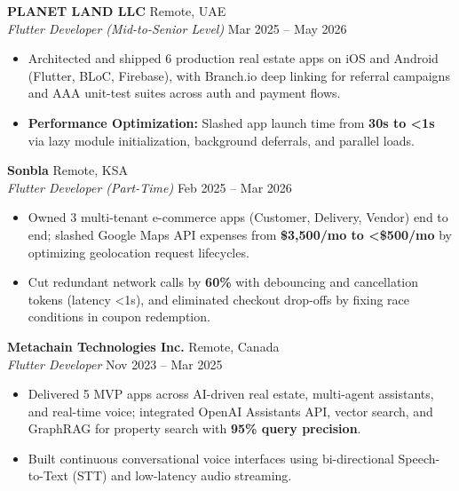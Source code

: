\documentclass[letterpaper,10pt]{article}
\begin{document}
\vspace{2pt}

\textbf{PLANET LAND LLC} \hfill Remote, UAE\\
\textit{Flutter Developer (Mid-to-Senior Level)} \hfill Mar 2025 -- May 2026
\begin{itemize}
    \item Architected and shipped 6 production real estate apps on iOS and Android (Flutter, BLoC, Firebase), with Branch.io deep linking for referral campaigns and AAA unit-test suites across auth and payment flows.
    \item \textbf{Performance Optimization:} Slashed app launch time from \textbf{30s to <1s} via lazy module initialization, background deferrals, and parallel loads.
\end{itemize}

\vspace{2pt}

\textbf{Sonbla} \hfill Remote, KSA\\
\textit{Flutter Developer (Part-Time)} \hfill Feb 2025 -- Mar 2026
\begin{itemize}
    \item Owned 3 multi-tenant e-commerce apps (Customer, Delivery, Vendor) end to end; slashed Google Maps API expenses from \textbf{\$3,500/mo to <\$500/mo} by optimizing geolocation request lifecycles.
    \item Cut redundant network calls by \textbf{60\%} with debouncing and cancellation tokens (latency <1s), and eliminated checkout drop-offs by fixing race conditions in coupon redemption.
\end{itemize}

\vspace{2pt}

\textbf{Metachain Technologies Inc.} \hfill Remote, Canada\\
\textit{Flutter Developer} \hfill Nov 2023 -- Mar 2025
\begin{itemize}
    \item Delivered 5 MVP apps across AI-driven real estate, multi-agent assistants, and real-time voice; integrated OpenAI Assistants API, vector search, and GraphRAG for property search with \textbf{95\% query precision}.
    \item Built continuous conversational voice interfaces using bi-directional Speech-to-Text (STT) and low-latency audio streaming.
\end{itemize}

\end{document}
